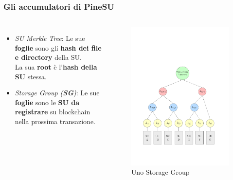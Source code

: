 \documentclass{beamer}
\begin{document}
\begin{frame}
	\frametitle{Gli accumulatori di PineSU}
	\begin{columns}
		\begin{itemize}%
			\item \emph{SU Merkle Tree}: Le sue \textbf{foglie} sono gli \textbf{hash dei file e directory} della SU.\\La sua \textbf{root} è l'\textbf{hash della SU} stessa. 
			\item \emph{Storage Group (\textbf{SG})}: Le sue \textbf{foglie} sono le \textbf{SU da registrare} su blockchain nella prossima transazione.
		\end{itemize}
		\centering
		\begin{figure}
			\includegraphics[width=\textwidth]{figures/sg1.pdf}
			\caption{Uno Storage Group}
		\end{figure} 
	\end{columns}
\end{frame}
\end{document}
